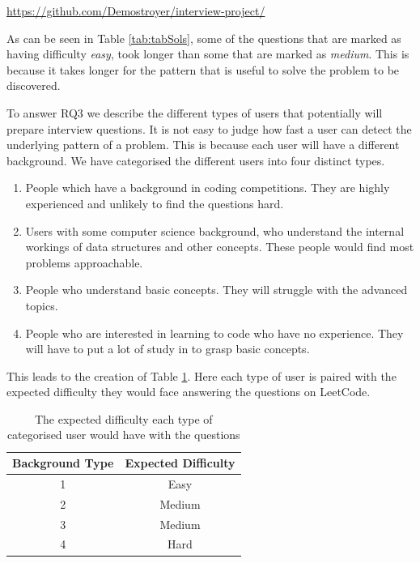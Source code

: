 \documentclass[conference]{IEEEtran}
\begin{document}
\begin{center}
\url{https://github.com/Demostroyer/interview-project/}
\end{center}
\par As can be seen in Table \ref{tab:tabSols}, some of the questions that are marked as having difficulty \textit{easy}, took longer than some that are marked as \textit{medium}. This is because it takes longer for the pattern that is useful to solve the problem to be discovered.
\par To answer RQ3 we describe the different types of users that potentially will prepare interview questions. It is not easy to judge how fast a user can detect the underlying pattern of a problem. This is because each user will have a different background. We have categorised the different users into four distinct types. 
\begin{enumerate}
\item{People which have a background in coding competitions. They are highly experienced and unlikely to find the questions hard.}
\item{Users with some computer science background, who understand the internal workings of data structures and other concepts. These people would find most problems approachable.}
\item{People who understand basic concepts. They will struggle with the advanced topics.}
\item{People who are interested in learning to code who have no experience. They will have to put a lot of study in to grasp basic concepts.}
\end{enumerate}
This leads to the creation of Table \ref{tab:difficulty}. Here each type of user is paired with the expected difficulty they would face answering the questions on LeetCode. 

\begin{table}[H]
\centering
	\begin{tabular}{| c | c |} \hline
		  {\bf Background Type} &{\bf Expected Difficulty} \\ \hline
		1 & Easy \\ \hline
		2 & Medium \\ \hline
		3 & Medium  \\ \hline
		4 & Hard  \\ \hline
	\end{tabular}
	\caption{The expected difficulty each type of categorised user would have with the questions}
	\label{tab:difficulty}
\end{table}
\end{document}
